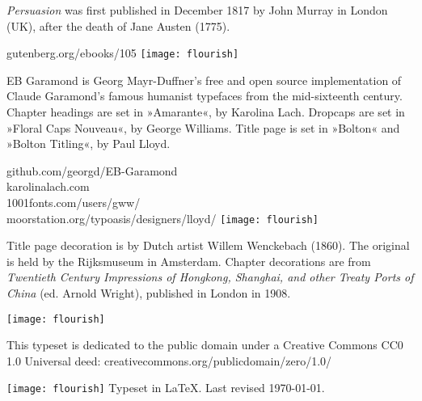 \documentclass[
a5paper,
]{scrbook}
\begin{document}
\vfill
\begin{minipage}{\textwidth}
\textit{Persuasion} was first published in December 1817 by John Murray in London (UK), after the death of Jane Austen (1775).
\end{minipage}
\vfill
gutenberg.org/ebooks/105
\vfill
\texttt{[image: flourish]}
\vfill
\begin{minipage}{\textwidth}
EB Garamond is Georg Mayr-Duffner's free and open source implementation of Claude Garamond’s famous humanist typefaces from the mid-sixteenth century. Chapter headings are set in »Amarante«, by Karolina Lach. Dropcaps are set in »Floral Caps Nouveau«, by George Williams. Title page is set in »Bolton« and »Bolton Titling«, by Paul Lloyd.
\end{minipage}
\vfill
github.com/georgd/EB-Garamond\\
karolinalach.com\\
1001fonts.com/users/gww/\\
moorstation.org/typoasis/designers/lloyd/
\vfill
\texttt{[image: flourish]}
\vfill
\begin{minipage}{\textwidth}
Title page decoration is by Dutch artist Willem Wenckebach (1860). The original is held by the Rijksmuseum in Amsterdam. Chapter decorations are from \textit{Twentieth Century Impressions of Hongkong, Shanghai, and other Treaty Ports of China} (ed. Arnold Wright), published in London in 1908.
\end{minipage}
\vfill
\texttt{[image: flourish]}
\vfill
\begin{minipage}{\textwidth}
This typeset is dedicated to the public domain under a Creative Commons CC0 1.0 Universal deed: creativecommons.org/publicdomain/zero/1.0/
\end{minipage}
\vfill
\texttt{[image: flourish]}
\vfill
Typeset in \LaTeX{}. Last revised \today.
\thispagestyle{empty}
\end{document}
